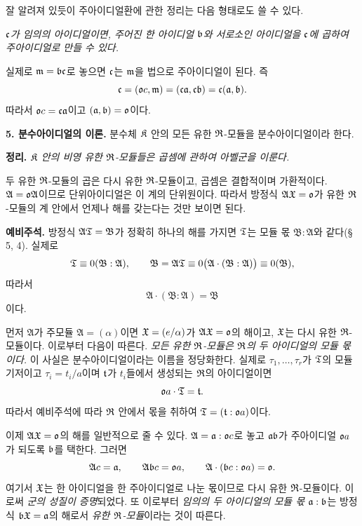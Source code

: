 잘 알려져 있듯이 주아이디얼환에 관한 정리는 다음 형태로도 쓸 수 있다.

\emph{\(\mathfrak{c}\)가 임의의 아이디얼이면, 주어진 한 아이디얼 \(\mathfrak{b}\)와 서로소인 아이디얼을 \(\mathfrak{c}\)에 곱하여 주아이디얼로 만들 수 있다.}

실제로 \(\mathfrak{m}=\mathfrak{b}\mathfrak{c}\)로 놓으면 \(\mathfrak{c}\)는 \(\mathfrak{m}\)을 법으로 주아이디얼이 된다. 즉
\[
        \mathfrak{c}=(\mathfrak{o} c,\mathfrak{m})=(\mathfrak{c}\mathfrak{a},\mathfrak{c}\mathfrak{b})=\mathfrak{c}(\mathfrak{a},\mathfrak{b}).
\]
따라서 \(\mathfrak{o} c=\mathfrak{c}\mathfrak{a}\)이고 \((\mathfrak{a},\mathfrak{b})=\mathfrak{o}\)이다.

\textbf{5. 분수아이디얼의 이론.} 분수체 \(\mathfrak{K}\) 안의 모든 유한 \(\mathfrak{R}\)-모듈을 분수아이디얼이라 한다.

\textbf{정리.} \emph{\(\mathfrak{K}\) 안의 비영 유한 \(\mathfrak{R}\)-모듈들은 곱셈에 관하여 아벨군을 이룬다.}

두 유한 \(\mathfrak{R}\)-모듈의 곱은 다시 유한 \(\mathfrak{R}\)-모듈이고, 곱셈은 결합적이며 가환적이다. \(\mathfrak A=\mathfrak{o}\mathfrak A\)이므로 단위아이디얼은 이 계의 단위원이다. 따라서 방정식 \(\mathfrak A\mathfrak X=\mathfrak{o}\)가 유한 \(\mathfrak{R}\)-모듈의 계 안에서 언제나 해를 갖는다는 것만 보이면 된다.

\textbf{예비주석.} 방정식 \(\mathfrak A\mathfrak{T}=\mathfrak B\)가 정확히 하나의 해를 가지면 \(\mathfrak{T}\)는 모듈 몫 \(\mathfrak B:\mathfrak A\)와 같다(§ 5, 4). 실제로
\[
\mathfrak{T}\equiv0(\mathfrak B:\mathfrak A),\qquad
\mathfrak B=\mathfrak A\mathfrak{T}
\equiv0\bigl(\mathfrak A\cdot(\mathfrak B:\mathfrak A)\bigr)
\equiv0(\mathfrak B),
\]
따라서
\[
        \mathfrak A\cdot(\mathfrak B:\mathfrak A)=\mathfrak B
\]
이다.

먼저 \(\mathfrak A\)가 주모듈 \(\mathfrak A=(\alpha)\)이면 \(\mathfrak X=(e/\alpha)\)가 \(\mathfrak A\mathfrak X=\mathfrak{o}\)의 해이고, \(\mathfrak X\)는 다시 유한 \(\mathfrak{R}\)-모듈이다. 이로부터 다음이 따른다. \emph{모든 유한 \(\mathfrak{R}\)-모듈은 \(\mathfrak{R}\)의 두 아이디얼의 모듈 몫이다.} 이 사실은 분수아이디얼이라는 이름을 정당화한다. 실제로 \(\tau_1,\ldots,\tau_r\)가 \(\mathfrak{T}\)의 모듈기저이고 \(\tau_i=t_i/a\)이며 \(\mathfrak{t}\)가 \(t_i\)들에서 생성되는 \(\mathfrak{R}\)의 아이디얼이면
\[
        \mathfrak{o} a\cdot\mathfrak{T}=\mathfrak{t}.
\]
따라서 예비주석에 따라 \(\mathfrak{R}\) 안에서 몫을 취하여 \(\mathfrak{T}=(\mathfrak{t}:\mathfrak{o} a)\)이다.

이제 \(\mathfrak A\mathfrak X=\mathfrak{o}\)의 해를 일반적으로 줄 수 있다. \(\mathfrak A=\mathfrak{a}:\mathfrak{o} c\)로 놓고 \(\mathfrak{a}\mathfrak{b}\)가 주아이디얼 \(\mathfrak{o} a\)가 되도록 \(\mathfrak{b}\)를 택한다. 그러면
\[
        \mathfrak A c=\mathfrak{a},
        \qquad
        \mathfrak A\mathfrak{b} c=\mathfrak{o} a,
        \qquad
        \mathfrak A\cdot(\mathfrak{b} c:\mathfrak{o} a)=\mathfrak{o}.
\]
여기서 \(\mathfrak X\)는 한 아이디얼을 한 주아이디얼로 나눈 몫이므로 다시 유한 \(\mathfrak{R}\)-모듈이다. 이로써 \emph{군의 성질이 증명}되었다. 또 이로부터 \emph{임의의 두 아이디얼의 모듈 몫 \(\mathfrak{a}:\mathfrak{b}\)}는 방정식 \(\mathfrak{b}\mathfrak X=\mathfrak{a}\)의 해로서 \emph{유한 \(\mathfrak{R}\)-모듈}이라는 것이 따른다.

